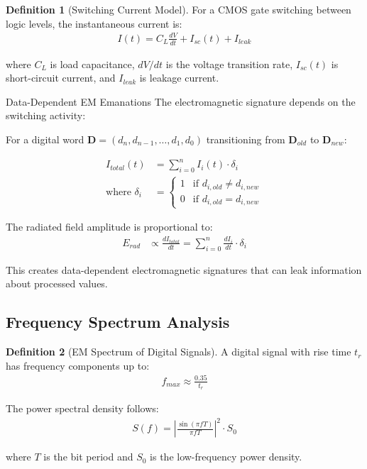 \documentclass[11pt,a4paper]{article}
\theoremstyle{definition}
\newtheorem{definition}{Definition}[section]
\begin{document}
\begin{definition}[Switching Current Model]
For a CMOS gate switching between logic levels, the instantaneous current is:
\begin{align}
I(t) = C_L \frac{dV}{dt} + I_{sc}(t) + I_{leak}
\end{align}

where $C_L$ is load capacitance, $dV/dt$ is the voltage transition rate, $I_{sc}(t)$ is short-circuit current, and $I_{leak}$ is leakage current.
\end{definition}

\begin{mathematicsbox}{Data-Dependent EM Emanations}
The electromagnetic signature depends on the switching activity:

For a digital word $\mathbf{D} = (d_n, d_{n-1}, \ldots, d_1, d_0)$ transitioning from $\mathbf{D}_{old}$ to $\mathbf{D}_{new}$:

\begin{align}
I_{total}(t) &= \sum_{i=0}^{n} I_i(t) \cdot \delta_i \\
\text{where } \delta_i &= \begin{cases}
1 & \text{if } d_{i,old} \neq d_{i,new} \\
0 & \text{if } d_{i,old} = d_{i,new}
\end{cases}
\end{align}

The radiated field amplitude is proportional to:
\begin{align}
E_{rad} &\propto \frac{dI_{total}}{dt} = \sum_{i=0}^{n} \frac{dI_i}{dt} \cdot \delta_i
\end{align}

This creates data-dependent electromagnetic signatures that can leak information about processed values.
\end{mathematicsbox}

\subsection{Frequency Spectrum Analysis}

\begin{definition}[EM Spectrum of Digital Signals]
A digital signal with rise time $t_r$ has frequency components up to:
\begin{align}
f_{max} \approx \frac{0.35}{t_r}
\end{align}

The power spectral density follows:
\begin{align}
S(f) = \left|\frac{\sin(\pi f T)}{\pi f T}\right|^2 \cdot S_0
\end{align}

where $T$ is the bit period and $S_0$ is the low-frequency power density.
\end{definition}
\end{document}
